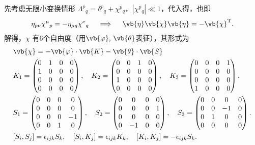 先考虑无限小变换情形 \(\Lambda^p{}_q = \delta^p{}_q + \chi^p{}_q\)，\(|\chi^p{}_q| \ll 1\)，代入得，也即
\begin{align*}
	\eta_{p\nu} \chi^\mu{}_p = -\eta_{\mu q} \chi^\nu{}_q \quad\implies\quad\vb{\eta} \vb{\chi} \vb{\eta} = -\vb{\chi}^\mathrm{T}.
\end{align*}
解得，\(\chi\) 有6个自由度（用\(\vb{\varphi},\,\vb{\theta}\)表征），其形式为
\begin{align*}
	 & \vb{\chi} = -\vb{\varphi} \cdot \vb{K} - \vb{\theta} \cdot \vb{S}                                               \\
	 & K_1 = \begin{pmatrix}
		         0 & 1 & 0 & 0 \\
		         1 & 0 & 0 & 0 \\
		         0 & 0 & 0 & 0 \\
		         0 & 0 & 0 & 0
	         \end{pmatrix}, \quad
	K_2 = \begin{pmatrix}
		      0 & 0 & 1 & 0 \\
		      0 & 0 & 0 & 0 \\
		      1 & 0 & 0 & 0 \\
		      0 & 0 & 0 & 0
	      \end{pmatrix}, \quad
	K_3 = \begin{pmatrix}
		      0 & 0 & 0 & 1 \\
		      0 & 0 & 0 & 0 \\
		      0 & 0 & 0 & 0 \\
		      1 & 0 & 0 & 0
	      \end{pmatrix}.                                                                                               \\
	 & S_1 = \begin{pmatrix}
		         0 & 0 & 0 & 0  \\
		         0 & 0 & 0 & 0  \\
		         0 & 0 & 0 & -1 \\
		         0 & 0 & 1 & 0
	         \end{pmatrix}, \quad
	S_2 = \begin{pmatrix}
		      0 & 0  & 0 & 0 \\
		      0 & 0  & 0 & 1 \\
		      0 & 0  & 0 & 0 \\
		      0 & -1 & 0 & 0
	      \end{pmatrix}, \quad
	S_3 = \begin{pmatrix}
		      0 & 0 & 0  & 0 \\
		      0 & 0 & -1 & 0 \\
		      0 & 1 & 0  & 0 \\
		      0 & 0 & 0  & 0
	      \end{pmatrix}.                                                                                               \\
	 & [S_i, S_j] = \epsilon_{ijk} S_k, \quad [S_i, K_j] = \epsilon_{ijk} K_k, \quad [K_i, K_j] = -\epsilon_{ijk} S_k.
\end{align*}


